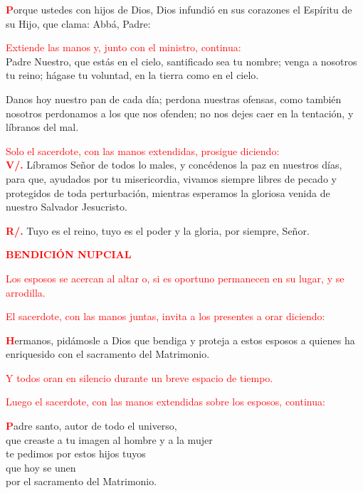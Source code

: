 \documentclass[12pt, letterpaper]{report}
\begin{document}
  \Large \lettrine[lines=2]{\bfseries \textcolor{red}{P}}{}orque ustedes con hijos de Dios, Dios infundi\'o en sus corazones el Esp\'iritu de su Hijo, que clama: Abb\'a, Padre:

  \large{\textcolor{red}{Extiende las manos y, junto con el ministro, continua:}}\\
  \Large Padre Nuestro, que estás en el cielo, santificado sea tu nombre; venga a nosotros tu reino; hágase tu voluntad, en la tierra como en el cielo.
  
  \Large Danos hoy nuestro pan de cada día; perdona nuestras ofensas, como también nosotros perdonamos a los que nos ofenden; no nos dejes caer en la tentación, y líbranos del mal.

  \large{\textcolor{red}{Solo el sacerdote, con las manos extendidas, prosigue diciendo:}}\\
  \Large {\bfseries \textcolor{red}{V/.}} \hspace{0.5cm} L\'ibramos Se\~nor de todos lo males, y conc\'edenos la paz en nuestros d\'ias, para que, ayudados por tu misericordia, vivamos siempre libres de pecado y protegidos de toda perturbaci\'on, mientras esperamos la gloriosa venida de nuestro Salvador Jesucristo.

  \noindent
  \Large {\bfseries \textcolor{red}{R/.}} \hspace{0.5cm} Tuyo es el reino, tuyo es el poder y la gloria, por siempre, Se\~nor.

  \Large {\bfseries \textcolor{red}{BENDICI\'ON NUPCIAL}} 

  \large{\textcolor{red}{Los esposos se acercan al altar o, si es oportuno permanecen en su lugar, y se arrodilla.}}

  \large{\textcolor{red}{El sacerdote, con las manos juntas, invita a los presentes a orar diciendo:}}

  \Large \lettrine[lines=2]{\bfseries \textcolor{red}{H}}{}ermanos, pid\'amosle a Dios que bendiga y proteja a estos esposos a quienes ha enriquesido con el sacramento del Matrimonio.

  \large{\textcolor{red}{Y todos oran en silencio durante un breve espacio de tiempo.}}

  \large{\textcolor{red}{Luego el sacerdote, con las manos extendidas sobre los esposos, continua:}}

  \Large \lettrine[lines=2]{\bfseries \textcolor{red}{P}}{}adre santo, autor de todo el universo,\\
  que creaste a tu imagen al hombre y a la mujer\\
  te pedimos por estos hijos tuyos\\
  que hoy se unen\\
  por el sacramento del Matrimonio.
\end{document}
